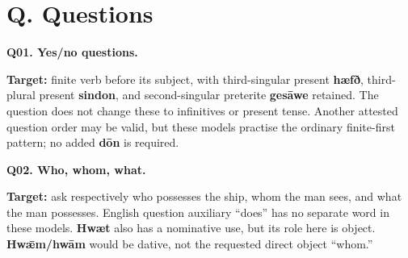 \section*{Q. Questions}

\par\begin{minipage}{\linewidth}\raggedright
\textbf{Q01. Yes/\allowbreak{}no questions.}




\textbf{Target:} finite verb before its subject, with third-singular present \textbf{hæfð}, third-plural present \textbf{sindon}, and second-singular preterite \textbf{gesāwe} retained. The question does not change these to infinitives or present tense. Another attested question order may be valid, but these models practise the ordinary finite-first pattern; no added \textbf{dōn} is required.

\end{minipage}\par\addvspace{4pt}

\newpage
\par\begin{minipage}{\linewidth}\raggedright
\textbf{Q02. Who, whom, what.}




\textbf{Target:} ask respectively who possesses the ship, whom the man sees, and what the man possesses. English question auxiliary “does” has no separate word in these models. \textbf{Hwæt} also has a nominative use, but its role here is object. \textbf{Hwǣm/\allowbreak{}hwām} would be dative, not the requested direct object “whom.”

\end{minipage}\par\addvspace{4pt}

